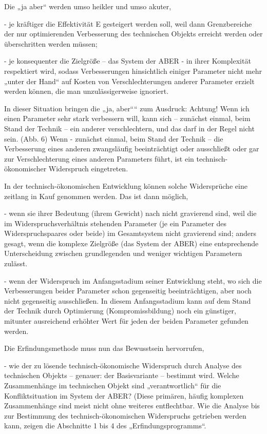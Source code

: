 \documentclass[12pt,a4paper]{article}
\begin{document}
Die „ja aber“ werden umso heikler und umso akuter,

- je kräftiger die Effektivität E gesteigert werden soll, weil dann Grenzbereiche der nur optimierenden Verbesserung des technischen Objekts erreicht werden oder überschritten werden müssen;

- je konsequenter die Zielgröße – das System der ABER - in ihrer Komplexität respektiert wird, sodass Verbesserungen hinsichtlich einiger Parameter nicht mehr „unter der Hand“ auf Kosten von Verschlechterungen anderer Parameter erzielt werden können, die man unzulässigerweise ignoriert.

In dieser Situation bringen die „ja, aber““ zum Ausdruck: Achtung! Wenn ich einen Parameter sehr stark verbessern will, kann sich – zunächst einmal, beim Stand der Technik – ein anderer verschlechtern, und das darf in der Regel nicht sein. (Abb. 6) Wenn - zunächst einmal, beim Stand der Technik – die Verbesserung eines anderen zwangsläufig beeinträchtigt oder ausschließt oder gar zur Verschlechterung eines anderen Parameters führt, ist ein technisch-ökonomischer Widerspruch eingetreten.

In der technisch-ökonomischen Entwicklung können solche Widersprüche eine zeitlang in Kauf genommen werden. Das ist dann möglich,

- wenn sie ihrer Bedeutung (ihrem Gewicht) nach nicht gravierend sind, weil die im Widerspruchsverhältnis stehenden Parameter (je ein Parameter des Widerspruchspaares oder beide) im Gesamtsystem nicht gravierend sind; anders gesagt, wenn die komplexe Zielgröße (das System der ABER) eine entsprechende Unterscheidung zwischen grundlegenden und weniger wichtigen Parametern zulässt.

- wenn der Widerspruch im Anfangsstadium seiner Entwicklung steht, wo sich die Verbesserungen beider Parameter schon gegenseitig beeinträchtigen, aber noch nicht gegenseitig ausschließen. In diesem Anfangsstadium kann auf dem Stand der Technik durch Optimierung (Kompromissbildung) noch ein günstiger, mitunter ausreichend erhöhter Wert für jeden der beiden Parameter gefunden werden.

Die Erfindungsmethode muss nun das Bewusstsein hervorrufen,

- wie der zu lösende technisch-ökonomische Widerspruch durch Analyse des technischen Objekts – genauer: der Basisvariante – bestimmt wird. Welche Zusammenhänge im technischen Objekt sind „verantwortlich“ für die Konfliktsituation im System der ABER? (Diese primären, häufig komplexen Zusammenhänge sind meist nicht ohne weiteres entflechtbar. Wie die Analyse bis zur Bestimmung des technisch-ökonomischen Widerspruchs getrieben werden kann, zeigen die Abschnitte 1 bis 4 des „Erfindungsprogramms“.
\end{document}
